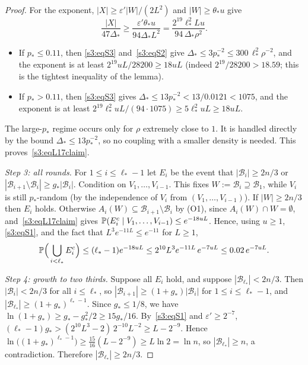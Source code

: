 \begin{proof}
For the exponent, $|X|\ge\varepsilon'|W|/(2L^2)$ and $|W|\ge\theta_*u$
give
\[
\frac{|X|}{47\Delta_*}\ge\frac{\varepsilon'\theta_*u}{94\Delta_*L^2}=\frac{2^{19}\ell_*^2Lu}{94\,\Delta_*\rho^2}.
\]
\begin{itemize}
\item If $p_*\le0.11$, then \ref{s3:eqS3} and~\ref{s3:eqS2} give
  $\Delta_*\le3p_*^{-2}\le300\,\ell_*^2\rho^{-2}$, and the exponent is at
  least $2^{19}uL/28200\ge18uL$ (indeed $2^{19}/28200>18.59$; this is the
  tightest inequality of the lemma).
\item If $p_*>0.11$, then \ref{s3:eqS3} gives
  $\Delta_*\le13p_*^{-2}<13/0.0121<1075$, and the exponent is at least
  $2^{19}\ell_*^2uL/(94\cdot1075)\ge5\ell_*^2uL\ge18uL$.
\end{itemize}
The large-$p_*$ regime occurs only for $\rho$ extremely close to $1$. It
is handled directly by the bound $\Delta_*\le13p_*^{-2}$, so no coupling
with a smaller density is needed. This proves~\eqref{s3:eqL17claim}.

\smallskip\noindent\emph{Step 3: all rounds.} For $1\le i\le\ell_*-1$ let
$E_i$ be the event that $|\mathcal B_i|\ge2n/3$ or
$|\mathcal B_{i+1}\setminus\mathcal B_i|\ge g_*|\mathcal B_i|$. Condition
on $V_1,\dots,V_{i-1}$. This fixes $W:=\mathcal B_i\supseteq\mathcal B_1$,
while $V_i$ is still $p_*$-random (by the independence of $V_i$ from
$(V_1,\dots,V_{i-1})$). If $|W|\ge2n/3$ then $E_i$ holds.
Otherwise $A_i(W)\subseteq\mathcal B_{i+1}\setminus\mathcal B_i$ by (O1),
since $A_i(W)\cap W=\emptyset$, and~\eqref{s3:eqL17claim} gives
$\mathbb{P}(E_i^c\mid V_1,\dots,V_{i-1})\le e^{-18uL}$. Hence, using $u\ge1$,
\ref{s3:eqS1}, and the fact that $L^3e^{-11L}\le e^{-11}$ for $L\ge1$,
\[
\mathbb{P}\Big(\bigcup_{i<\ell_*}E_i^c\Big)\le(\ell_*-1)e^{-18uL}\le2^{10}L^3e^{-11L}\,e^{-7uL}\le0.02\,e^{-7uL}.
\]

\smallskip\noindent\emph{Step 4: growth to two thirds.} Suppose all
$E_i$ hold, and suppose $|\mathcal B_{\ell_*}|<2n/3$. Then
$|\mathcal B_i|<2n/3$ for all $i\le\ell_*$, so
$|\mathcal B_{i+1}|\ge(1+g_*)|\mathcal B_i|$ for $1\le i\le\ell_*-1$, and
$|\mathcal B_{\ell_*}|\ge(1+g_*)^{\ell_*-1}$. Since $g_*\le1/8$, we have
$\ln(1+g_*)\ge g_*-g_*^2/2\ge15g_*/16$. By~\ref{s3:eqS1} and
$\varepsilon'\ge2^{-7}$,
$(\ell_*-1)g_*>(2^{10}L^3-2)\,2^{-10}L^{-2}\ge L-2^{-9}$. Hence
$\ln\big((1+g_*)^{\ell_*-1}\big)\ge\tfrac{15}{16}(L-2^{-9})\ge L\ln2=\ln n$,
so $|\mathcal B_{\ell_*}|\ge n$, a contradiction. Therefore
$|\mathcal B_{\ell_*}|\ge2n/3$.


\end{proof}
